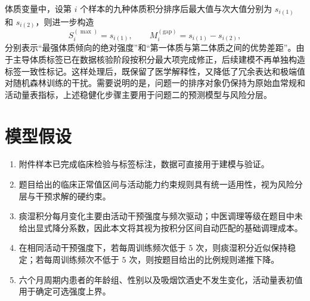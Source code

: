 \documentclass{MathorCupmodeling}
\begin{document}
			体质变量中，设第 $i$ 个样本的九种体质积分排序后最大值与次大值分别为 $s_{i(1)}$ 和 $s_{i(2)}$，则进一步构造
			\begin{equation}
				S_i^{(\max)}=s_{i(1)},\qquad
				M_i^{(\text{gap})}=s_{i(1)}-s_{i(2)},
			\end{equation}
			分别表示“最强体质倾向的绝对强度”和“第一体质与第二体质之间的优势差距”。由于主导体质标签已在数据核验阶段按积分最大项完成修正，后续建模不再单独构造标签一致性标记。这样处理后，既保留了医学解释性，又降低了冗余表达和极端值对随机森林训练的干扰。需要说明的是，问题一的排序对象仍保持为原始血常规和活动量表指标，上述稳健化步骤主要用于问题二的预测模型与风险分层。

	\section{模型假设}
	\begin{enumerate}
		\item 附件样本已完成临床检验与标签标注，数据可直接用于建模与验证。
		\item 题目给出的临床正常值区间与活动能力约束规则具有统一适用性，视为风险分层与干预求解的硬约束。
		\item 痰湿积分每月变化主要由活动干预强度与频次驱动；中医调理等级在题目中未给出显式降分系数，因此本文将其视为按积分区间自动匹配的基础调理成本。
		\item 在相同活动干预强度下，若每周训练频次低于 $5$ 次，则痰湿积分近似保持稳定；若每周训练频次不低于 $5$ 次，则按题目给出的比例规则递推下降。
		\item 六个月周期内患者的年龄组、性别以及吸烟饮酒史不发生变化，活动量表初值用于确定可选强度上界。
	\end{enumerate}
\end{document}
